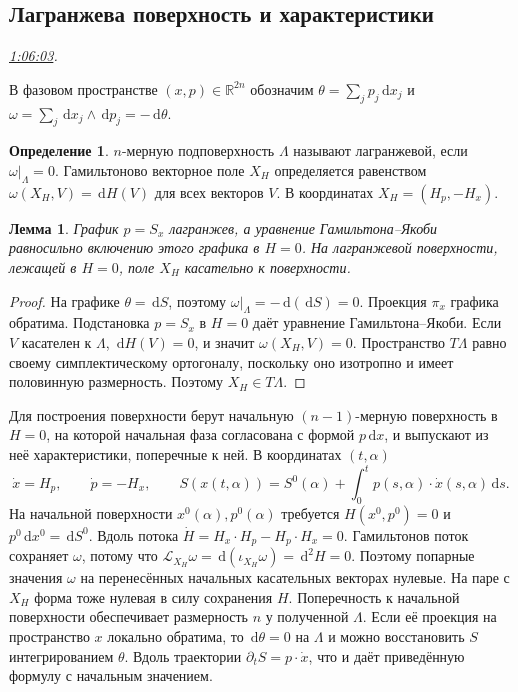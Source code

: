 \documentclass[11pt,a4paper]{article}
\theoremstyle{plain}
\newtheorem{lemma}[theorem]{Лемма}
\theoremstyle{definition}
\newtheorem{definition}[theorem]{Определение}
\newcommand{\RR}{\mathbb R}
\newcommand{\dd}{\,\mathrm d}
\newcommand{\at}[3]{\href{https://www.youtube.com/watch?v=#1&t=#2s}{#3}}
\newcommand{\topic}[2]{\Needspace{5\baselineskip}\subsection*{#1}\noindent\emph{#2.}\par\nobreak\smallskip}
\begin{document}
\topic{Лагранжева поверхность и характеристики}{\at{Ks_j6QaMPJ4}{3963}{1:06:03}}
В фазовом пространстве $(x,p)\in\RR^{2n}$ обозначим
$\theta=\sum_jp_j\dd x_j$ и
$\omega=\sum_j\dd x_j\wedge\dd p_j=-\dd\theta$.
\begin{definition}
$n$-мерную подповерхность $\Lambda$ называют лагранжевой,
если $\omega|_\Lambda=0$. Гамильтоново векторное поле
$X_H$ определяется равенством $\omega(X_H,V)=\dd H(V)$
для всех векторов $V$. В координатах $X_H=(H_p,-H_x)$.
\end{definition}
\begin{lemma}
График $p=S_x$ лагранжев, а уравнение Гамильтона--Якоби
равносильно включению этого графика в $H=0$.
На лагранжевой поверхности, лежащей в $H=0$, поле $X_H$
касательно к поверхности.
\end{lemma}
\begin{proof}
На графике $\theta=\dd S$, поэтому
$\omega|_\Lambda=-\dd(\dd S)=0$. Проекция $\pi_x$ графика
обратима. Подстановка $p=S_x$ в $H=0$ даёт уравнение
Гамильтона--Якоби. Если $V$ касателен к $\Lambda$,
$\dd H(V)=0$, и значит $\omega(X_H,V)=0$. Пространство
$T\Lambda$ равно своему симплектическому ортогоналу,
поскольку оно изотропно и имеет половинную размерность.
Поэтому $X_H\in T\Lambda$.
\end{proof}
Для построения поверхности берут начальную
$(n-1)$-мерную поверхность в $H=0$, на которой начальная фаза
согласована с формой $p\dd x$, и выпускают из неё характеристики,
поперечные к ней. В координатах $(t,\alpha)$
\[
 \dot x=H_p,\qquad \dot p=-H_x,\qquad
 S(x(t,\alpha))=S^0(\alpha)+
       \int_0^t p(s,\alpha)\cdot\dot x(s,\alpha)\dd s .
\]
На начальной поверхности $x^0(\alpha),p^0(\alpha)$ требуется
$H(x^0,p^0)=0$ и $p^0\dd x^0=\dd S^0$.
Вдоль потока $\dot H=H_x\cdot H_p-H_p\cdot H_x=0$.
Гамильтонов поток сохраняет $\omega$, потому что
$\mathcal L_{X_H}\omega=\dd(\iota_{X_H}\omega)=\dd^2H=0$.
Поэтому попарные значения $\omega$ на перенесённых
начальных касательных векторах нулевые. На паре с
$X_H$ форма тоже нулевая в силу сохранения $H$.
Поперечность к начальной поверхности обеспечивает
размерность $n$ у полученной $\Lambda$. Если её
проекция на пространство $x$ локально обратима, то
$\dd\theta=0$ на $\Lambda$ и можно восстановить $S$
интегрированием $\theta$. Вдоль траектории
$\partial_t S=p\cdot\dot x$, что и даёт приведённую
формулу с начальным значением.
\end{document}

